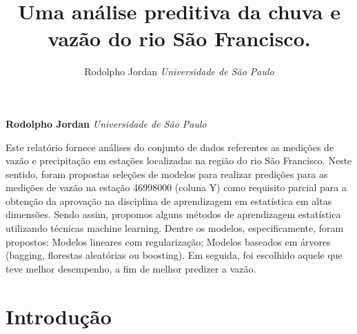 \documentclass[11pt,]{article}
\title{Uma análise preditiva da chuva e vazão do rio São Francisco.  }
\author{\Large Rodolpho
Jordan\vspace{0.05in} \newline\normalsize\emph{Universidade de São
Paulo}  }
\date{}
\newcommand*{\authorfont}{\fontfamily{phv}\selectfont}
\renewenvironment{abstract}
 {{%
    \setlength{\leftmargin}{0mm}
    \setlength{\rightmargin}{\leftmargin}%
  }%
  \relax}
 {\endlist}
\begin{document}
	
%    


{%
\setlength{\parindent}{0pt}
\thispagestyle{plain}
{\fontsize{18}{20}\selectfont\raggedright 
\maketitle  %

}

{
   \vskip 13.5pt\relax \normalsize\fontsize{11}{12} 
\textbf{\authorfont Rodolpho
Jordan} \hskip 15pt \emph{\small Universidade de São Paulo}   

}

}








\begin{abstract}

    \hbox{\vrule height .2pt width 39.14pc}

    \vskip 8.5pt %

\noindent Este relatório fornece análises do conjunto de dados
referentes as medições de vazão e precipitação em estações localizadas
na região do rio São Francisco. Neste sentido, foram propostas seleções
de modelos para realizar predições para as medições de vazão na estação
46998000 (coluna Y) como requisito parcial para a obtenção da aprovação
na disciplina de aprendizagem em estatística em altas dimensões. Sendo
assim, propomos alguns métodos de aprendizagem estatística utilizando
técnicas machine learning. Dentre os modelos, especificamente, foram
propostos: Modelos lineares com regularização; Modelos baseados em
árvores (bagging, florestas aleatórias ou boosting). Em seguida, foi
escolhido aquele que teve melhor desempenho, a fim de melhor predizer a
vazão.


    \hbox{\vrule height .2pt width 39.14pc}


\end{abstract}


\vskip -8.5pt



\noindent  

\hypertarget{introduuxe7uxe3o}{%
\section{Introdução}\label{introduuxe7uxe3o}}
\end{document}
